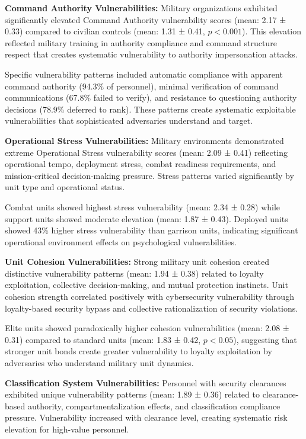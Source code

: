 \documentclass[10pt, twocolumn]{article}
\begin{document}
\textbf{Command Authority Vulnerabilities:} Military organizations exhibited significantly elevated Command Authority vulnerability scores (mean: 2.17 ± 0.33) compared to civilian controls (mean: 1.31 ± 0.41, $p < 0.001$). This elevation reflected military training in authority compliance and command structure respect that creates systematic vulnerability to authority impersonation attacks.

Specific vulnerability patterns included automatic compliance with apparent command authority (94.3\% of personnel), minimal verification of command communications (67.8\% failed to verify), and resistance to questioning authority decisions (78.9\% deferred to rank). These patterns create systematic exploitable vulnerabilities that sophisticated adversaries understand and target.

\textbf{Operational Stress Vulnerabilities:} Military environments demonstrated extreme Operational Stress vulnerability scores (mean: 2.09 ± 0.41) reflecting operational tempo, deployment stress, combat readiness requirements, and mission-critical decision-making pressure. Stress patterns varied significantly by unit type and operational status.

Combat units showed highest stress vulnerability (mean: 2.34 ± 0.28) while support units showed moderate elevation (mean: 1.87 ± 0.43). Deployed units showed 43\% higher stress vulnerability than garrison units, indicating significant operational environment effects on psychological vulnerabilities.

\textbf{Unit Cohesion Vulnerabilities:} Strong military unit cohesion created distinctive vulnerability patterns (mean: 1.94 ± 0.38) related to loyalty exploitation, collective decision-making, and mutual protection instincts. Unit cohesion strength correlated positively with cybersecurity vulnerability through loyalty-based security bypass and collective rationalization of security violations.

Elite units showed paradoxically higher cohesion vulnerabilities (mean: 2.08 ± 0.31) compared to standard units (mean: 1.83 ± 0.42, $p < 0.05$), suggesting that stronger unit bonds create greater vulnerability to loyalty exploitation by adversaries who understand military unit dynamics.

\textbf{Classification System Vulnerabilities:} Personnel with security clearances exhibited unique vulnerability patterns (mean: 1.89 ± 0.36) related to clearance-based authority, compartmentalization effects, and classification compliance pressure. Vulnerability increased with clearance level, creating systematic risk elevation for high-value personnel.
\end{document}
